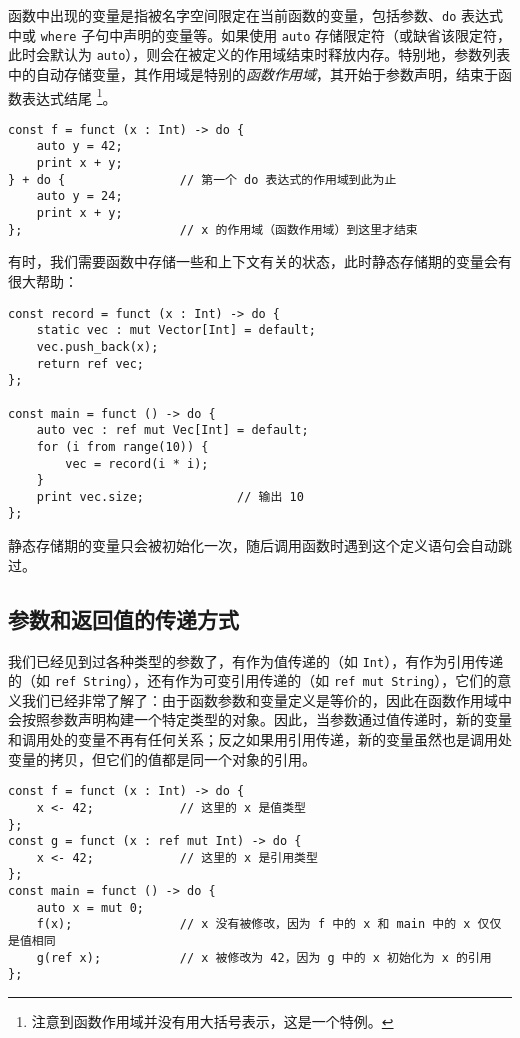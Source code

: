 函数中出现的变量是指被名字空间限定在当前函数的变量，包括参数、\lstinline!do! 表达式中或 \lstinline!where! 子句中声明的变量等。如果使用 \lstinline!auto! 存储限定符（或缺省该限定符，此时会默认为 \lstinline!auto!），则会在被定义的作用域结束时释放内存。特别地，参数列表中的自动存储变量，其作用域是特别的\emph{函数作用域}，其开始于参数声明，结束于函数表达式结尾 \footnote{注意到函数作用域并没有用大括号表示，这是一个特例。}。

\begin{lstlisting}
const f = funct (x : Int) -> do {
	auto y = 42;
	print x + y;
} + do {				// 第一个 do 表达式的作用域到此为止
	auto y = 24;
	print x + y;
};						// x 的作用域（函数作用域）到这里才结束
\end{lstlisting}

有时，我们需要函数中存储一些和上下文有关的状态，此时静态存储期的变量会有很大帮助：

\begin{lstlisting}
const record = funct (x : Int) -> do {
	static vec : mut Vector[Int] = default;
	vec.push_back(x);
	return ref vec;
};

const main = funct () -> do {
	auto vec : ref mut Vec[Int] = default;
	for (i from range(10)) {
		vec = record(i * i);
	}
	print vec.size;				// 输出 10
};
\end{lstlisting}

静态存储期的变量只会被初始化一次，随后调用函数时遇到这个定义语句会自动跳过。

\subsection{参数和返回值的传递方式}

我们已经见到过各种类型的参数了，有作为值传递的（如 \lstinline!Int!），有作为引用传递的（如 \lstinline!ref String!），还有作为可变引用传递的（如 \lstinline!ref mut String!），它们的意义我们已经非常了解了：由于函数参数和变量定义是等价的，因此在函数作用域中会按照参数声明构建一个特定类型的对象。因此，当参数通过值传递时，新的变量和调用处的变量不再有任何关系；反之如果用引用传递，新的变量虽然也是调用处变量的拷贝，但它们的值都是同一个对象的引用。

\begin{lstlisting}
const f = funct (x : Int) -> do {
	x <- 42;			// 这里的 x 是值类型
};
const g = funct (x : ref mut Int) -> do {
	x <- 42;			// 这里的 x 是引用类型
};
const main = funct () -> do {
	auto x = mut 0;
	f(x);				// x 没有被修改，因为 f 中的 x 和 main 中的 x 仅仅是值相同
	g(ref x);			// x 被修改为 42，因为 g 中的 x 初始化为 x 的引用
};
\end{lstlisting}

